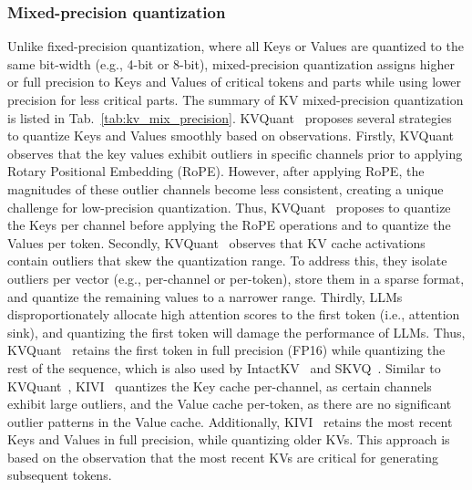 \subsubsection{Mixed-precision quantization}\label{sssec:kv_quant_mixed_precision}
Unlike fixed-precision quantization, where all Keys or Values are quantized to the same bit-width (e.g., 4-bit or 8-bit), 
mixed-precision quantization assigns higher or full precision to Keys and Values of critical tokens and parts while using lower precision for less critical parts.
The summary of KV mixed-precision quantization is listed in Tab.~\ref{tab:kv_mix_precision}.
KVQuant~\cite{hooper2024kvquant} proposes several strategies to quantize Keys and Values smoothly based on observations.
Firstly, KVQuant observes that the key values exhibit outliers in specific channels prior to applying Rotary Positional Embedding (RoPE).
However, after applying RoPE, the magnitudes of these outlier channels become less consistent, creating a unique challenge for low-precision quantization.
Thus, KVQuant~\cite{hooper2024kvquant} proposes to quantize the Keys per channel before applying the RoPE operations and to quantize the Values per token.
Secondly, KVQuant~\cite{hooper2024kvquant} observes that KV cache activations contain outliers that skew the quantization range. To address this, they isolate outliers per vector (e.g., per-channel or per-token), store them in a sparse format, and quantize the remaining values to a narrower range.
Thirdly, LLMs disproportionately allocate high attention scores to the first token (i.e., attention sink), and quantizing the first token will damage the performance of LLMs.
Thus, KVQuant~\cite{hooper2024kvquant} retains the first token in full precision (FP16) while quantizing the rest of the sequence, which is also used by IntactKV~\cite{liu2024intactkv} and SKVQ~\cite{duanmu2024skvq}.
Similar to KVQuant~\cite{hooper2024kvquant}, KIVI~\cite{liu2024kivi} quantizes the Key cache per-channel, as certain channels exhibit large outliers, and the Value cache per-token,  as there are no significant outlier patterns in the Value cache.
Additionally, KIVI~\cite{liu2024kivi} retains the most recent Keys and Values in full precision, while quantizing older KVs. This approach is based on the observation that the most recent KVs are critical for generating subsequent tokens.


